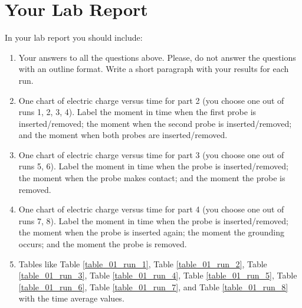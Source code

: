 \section{Your Lab Report}
In your lab report you should include:
\begin{enumerate}
	\item Your answers to all the questions above. Please, do not answer the questions with an outline format. Write a short paragraph with your results for each run.
	\item One chart of electric charge versus time for part 2 (you choose one out of runs 1, 2, 3, 4). Label the moment in time when the first probe is inserted/removed; the moment when the second probe is inserted/removed; and the moment when both probes are inserted/removed.
	\item One chart of electric charge versus time for part 3 (you choose one out of runs 5, 6). Label the moment in time when the probe is inserted/removed; the moment when the probe makes contact; and the moment the probe is removed.
	\item One chart of electric charge versus time for part 4 (you choose one out of runs 7, 8). Label the moment in time when the probe is inserted/removed; the moment when the probe is inserted again; the moment the grounding occurs; and the moment the probe is removed.
	\item Tables like Table \ref{table_01_run_1}, Table \ref{table_01_run_2}, Table \ref{table_01_run_3}, Table \ref{table_01_run_4}, Table \ref{table_01_run_5}, Table \ref{table_01_run_6}, Table \ref{table_01_run_7}, and Table \ref{table_01_run_8} with the time average values.
\end{enumerate}
\newpage
